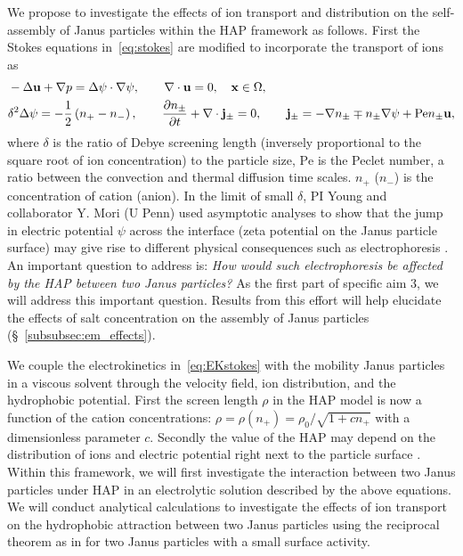 We propose to investigate the effects of ion transport and distribution on the self-assembly of Janus particles within the HAP framework as follows.
First the Stokes equations in~\eqref{eq:stokes} are modified to incorporate the transport of ions as
\begin{equation}
\label{eq:EKstokes}
\begin{aligned}
  &-\Delta \mathbf{u} + \nabla p = \Delta\psi\cdot\nabla\psi, \qquad
  \nabla \cdot \mathbf{u} = 0,  \quad \mathbf{x} \in \Omega,\\
  &\delta^2\Delta\psi = -\frac{1}{2}\left(n_+-n_-\right),\qquad
  \frac{\partial n_{\pm}}{\partial t} + \nabla\cdot{\bf j}_{\pm} = 0,\qquad {\bf j}_{\pm} = -\nabla n_{\pm} \mp n_{\pm} \nabla\psi + \mbox{Pe} n_{\pm}\mathbf{u},
\end{aligned}
\end{equation}
where $\delta$ is the ratio of Debye screening length (inversely proportional to the square root of
ion concentration) to the particle size, 
$\mbox{Pe}$ is the Peclet number, a ratio between the convection and  thermal diffusion time scales.
$n_{+}$ ($n_{-}$) is the concentration of cation (anion).  In the limit of small $\delta$, PI Young and collaborator Y. Mori (U Penn) used asymptotic analyses to show that the jump in electric potential $\psi$ across the interface (zeta potential on the Janus particle surface) 
may give rise to different physical consequences such as electrophoresis \cite{Mori2018_JFM}.
%
An important question to address is: {\it How would such electrophoresis be affected by the HAP between two Janus particles?} 
As the first part of specific aim 3, we will address this important question. Results from this effort will help elucidate the effects of salt concentration on the assembly of Janus particles (\S~\ref{subsubsec:em_effects}).

We couple the electrokinetics in~\eqref{eq:EKstokes} with the mobility Janus particles in a viscous solvent through the velocity field, ion distribution, and the hydrophobic potential.  
First the screen length $\rho$ in the HAP model is now a function of the  cation concentrations: $\rho = \rho(n_+) =
\rho_0/\sqrt{1+c n_+}$ with a dimensionless parameter $c$. 
%
Secondly the value of the HAP may depend on the distribution of ions and electric potential right next to the particle surface \cite{Mori2018_JFM}.
Within this framework, we will first investigate the interaction between two Janus particles under HAP in an electrolytic solution described by the above
equations. We will conduct analytical calculations to investigate the effects of ion transport on the hydrophobic attraction between two Janus particles using the reciprocal theorem as in \cite{BayatiNajafi2016_JCP} for two Janus particles with a small surface activity.




